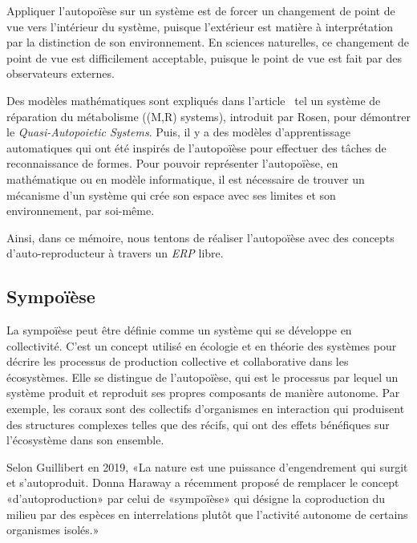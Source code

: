 Appliquer l'autopoïèse sur un système est de forcer un changement de point de vue vers l'intérieur du système, puisque l'extérieur est matière à interprétation par la distinction de son environnement. En sciences naturelles, ce changement de point de vue est difficilement acceptable, puisque le point de vue est fait par des observateurs externes.

Des modèles mathématiques sont expliqués dans l'article~\cite{tatsuya_computational_autopoiesis_2000} tel un système de réparation du métabolisme ((M,R) systems), introduit par Rosen, pour démontrer le \textit{Quasi-Autopoietic Systems}.
Puis, il y a des modèles d'apprentissage automatiques qui ont été inspirés de l'autopoïèse pour effectuer des tâches de reconnaissance de formes. Pour pouvoir représenter l'autopoïèse, en mathématique ou en modèle informatique, il est nécessaire de trouver un mécanisme d'un système qui crée son espace avec ses limites et son environnement, par soi-même.

Ainsi, dans ce mémoire, nous tentons de réaliser l'autopoïèse avec des concepts d'auto-reproducteur à travers un \textit{ERP} libre.


\subsection{Sympoïèse}

La sympoïèse peut être définie comme un système qui se développe en collectivité. C'est un concept utilisé en écologie et en théorie des systèmes pour décrire les processus de production collective et collaborative dans les écosystèmes. Elle se distingue de l'autopoïèse, qui est le processus par lequel un système produit et reproduit ses propres composants de manière autonome. Par exemple, les coraux sont des collectifs d'organismes en interaction qui produisent des structures complexes telles que des récifs, qui ont des effets bénéfiques sur l'écosystème dans son ensemble.

Selon Guillibert en 2019, «La nature est une puissance d’engendrement qui surgit et s’autoproduit. Donna Haraway a récemment proposé de remplacer le concept «d’autoproduction» par celui de «sympoïèse» qui désigne la coproduction du milieu par des espèces en interrelations plutôt que l’activité autonome de certains organismes isolés.»~\cite{guillibert:tel-02929676}

